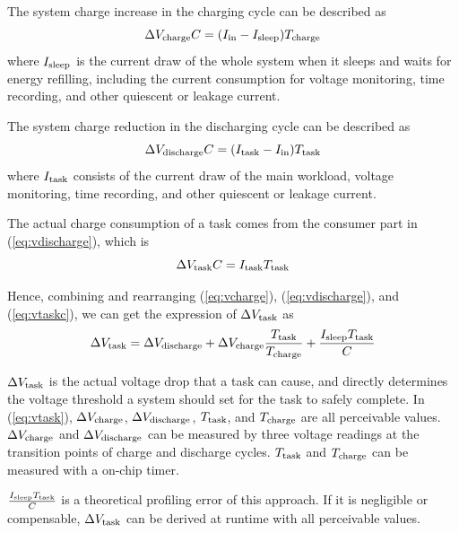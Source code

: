 The system charge increase in the charging cycle can be described as
\begin{equation}
    \Delta V_{\text{charge}} C = (I_{\text{in}} - I_{\text{sleep}}) T_{\text{charge}}
    \label{eq:vcharge} 
\end{equation}
where $I_{\text{sleep}}$ is the current draw of the whole system when it sleeps and waits for energy refilling, including the current consumption for voltage monitoring, time recording, and other quiescent or leakage current.  

The system charge reduction in the discharging cycle can be described as
\begin{equation}
    \Delta V_{\text{discharge}} C = (I_{\text{task}} - I_{\text{in}}) T_{\text{task}}
    \label{eq:vdischarge} 
\end{equation}
where $I_{\text{task}}$ consists of the current draw of the main workload, voltage monitoring, time recording, and other quiescent or leakage current. 

The actual charge consumption of a task comes from the consumer part in (\ref{eq:vdischarge}), which is
\begin{equation}
    \Delta V_{\text{task}} C = I_{\text{task}} T_{\text{task}}
    \label{eq:vtaskc} 
\end{equation}

Hence, combining and rearranging (\ref{eq:vcharge}), (\ref{eq:vdischarge}), and (\ref{eq:vtaskc}), we can get the expression of $\Delta V_{\text{task}}$ as
\begin{equation}
    \Delta V_{\text{task}} = \Delta V_{\text{discharge}} + \Delta V_{\text{charge}} \frac{T_{\text{task}}}{T_{\text{charge}}} + \frac{I_{\text{sleep}}T_{\text{task}}}{C}
    \label{eq:vtask} 
\end{equation}

$\Delta V_{\text{task}}$ is the actual voltage drop that a task can cause, and directly determines the voltage threshold a system should set for the task to safely complete.
In (\ref{eq:vtask}), $\Delta V_{\text{charge}}$, $\Delta V_{\text{discharge}}$, $T_{\text{task}}$, and $T_{\text{charge}}$ are all perceivable values.
$\Delta V_{\text{charge}}$ and $\Delta V_{\text{discharge}}$ can be measured by three voltage readings at the transition points of charge and discharge cycles.  
$T_{\text{task}}$ and $T_{\text{charge}}$ can be measured with a on-chip timer. 

$\frac{I_{\text{sleep}}T_{\text{task}}}{C}$ is a theoretical profiling error of this approach.
If it is negligible or compensable, $\Delta V_{\text{task}}$ can be derived at runtime with all perceivable values. 

